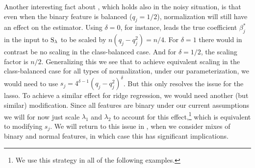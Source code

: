 Another interesting fact about , which holds also in the noisy
situation, is that even when the binary feature is balanced (\(q_j = 1/2\)), normalization
will still have an effect on the estimator. Using \(\delta = 0\), for instance, leads the
true coefficient \(\beta_j^*\) in the input to \(\operatorname{S}_\lambda\) to be scaled by \(n (q_j -
q_j^2) = n/4\). For \(\delta = 1\) there would in contrast be no scaling in the
class-balanced case. And for \(\delta = 1/2\), the scaling factor is \(n/2\). Generalizing
this we see that to achieve equivalent scaling in the class-balanced case for all types of
normalization, under our parameterization, we would need to use \(s_j = 4^{\delta - 1} (q_j
- q_j^2)^\delta\). But this only resolves the issue for the lasso. To achieve a similar
effect for ridge regression, we would need another (but similar) modification. Since all
features are binary under our current assumptions we will for now just scale \(\lambda_1\)
and \(\lambda_2\) to account for this effect,\footnote{We use this strategy in all of the
  following examples.} which is equivalent to modifying \(s_j\). We will return to this issue
in , when we consider mixes of binary and normal features, in which
case this has significant implications.

